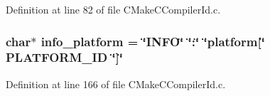 Definition at line 82 of file CMakeCCompilerId.c.
\subsubsection{\setlength{\rightskip}{0pt plus 5cm}char$\ast$ {\bf info\_\-platform} = \char`\"{}INFO\char`\"{} \char`\"{}:\char`\"{} \char`\"{}platform[\char`\"{} PLATFORM\_\-ID \char`\"{}]\char`\"{}}\label{CMakeCCompilerId_8c_bfa30dab5bd89c85774e2aaaca5262d1}




Definition at line 166 of file CMakeCCompilerId.c.